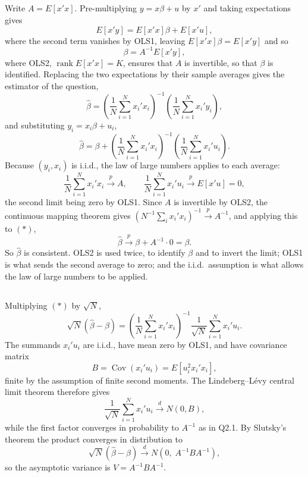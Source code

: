 \documentclass[11pt]{article}
\DeclareMathOperator{\Cov}{Cov}
\begin{document}
\subsection{}
Write $A = E[x'x]$. Pre-multiplying $y = x\beta + u$ by $x'$ and taking
expectations gives
\[
E[x'y] = E[x'x]\beta + E[x'u],
\]
where the second term vanishes by OLS1, leaving $E[x'x]\beta = E[x'y]$ and so
\[
\beta = A^{-1}E[x'y],
\]
where OLS2, $\operatorname{rank}E[x'x] = K$, ensures that $A$ is invertible, so
that $\beta$ is identified. Replacing the two expectations by their sample
averages gives the estimator of the question,
\[
\hat\beta = \left(\frac{1}{N}\sum_{i=1}^{N} x_i'x_i\right)^{-1}
            \left(\frac{1}{N}\sum_{i=1}^{N} x_i'y_i\right),
\]
and substituting $y_i = x_i\beta + u_i$,
\begin{equation*}
\hat\beta = \beta + \left(\frac{1}{N}\sum_{i=1}^{N} x_i'x_i\right)^{-1}
            \left(\frac{1}{N}\sum_{i=1}^{N} x_i'u_i\right).
\tag{$\ast$}
\end{equation*}
Because $(y_i,x_i)$ is i.i.d., the law of large numbers applies to each
average:
\[
\frac{1}{N}\sum_{i=1}^{N} x_i'x_i \overset{p}{\to} A,
\qquad
\frac{1}{N}\sum_{i=1}^{N} x_i'u_i \overset{p}{\to} E[x'u] = 0,
\]
the second limit being zero by OLS1. Since $A$ is invertible by OLS2, the
continuous mapping theorem gives
$\left(N^{-1}\sum_i x_i'x_i\right)^{-1} \overset{p}{\to} A^{-1}$, and
applying this to $(\ast)$,
\[
\hat\beta \overset{p}{\to} \beta + A^{-1}\cdot 0 = \beta .
\]
So $\hat\beta$ is consistent. OLS2 is used twice, to identify $\beta$ and to
invert the limit; OLS1 is what sends the second average to zero; and the
i.i.d.\ assumption is what allows the law of large numbers to be applied.

\subsection{}
Multiplying $(\ast)$ by $\sqrt{N}$,
\[
\sqrt{N}(\hat\beta - \beta)
= \left(\frac{1}{N}\sum_{i=1}^{N} x_i'x_i\right)^{-1}
  \frac{1}{\sqrt{N}}\sum_{i=1}^{N} x_i'u_i .
\]
The summands $x_i'u_i$ are i.i.d., have mean zero by OLS1, and have covariance
matrix
\[
B = \Cov(x_i'u_i) = E[u_i^2 x_i'x_i],
\]
finite by the assumption of finite second moments. The Lindeberg--L\'evy
central limit theorem therefore gives
\[
\frac{1}{\sqrt{N}}\sum_{i=1}^{N} x_i'u_i \overset{d}{\to} N(0, B),
\]
while the first factor converges in probability to $A^{-1}$ as in Q2.1. By
Slutsky's theorem the product converges in distribution to
\[
\sqrt{N}(\hat\beta - \beta) \overset{d}{\to} N\!\left(0,\; A^{-1}BA^{-1}\right),
\]
so the asymptotic variance is $V = A^{-1}BA^{-1}$.
\end{document}
